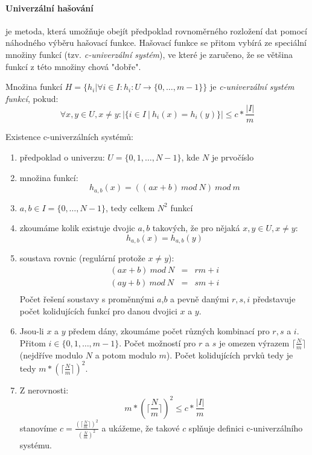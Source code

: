 \documentclass[a4paper]{article}      %
\newenvironment{definition}[1][Definice]{\begin{trivlist}
\item[\hskip \labelsep {\bfseries #1}]}{\end{trivlist}}
\begin{document}
\paragraph{Univerzální hašování} je metoda, která umožňuje obejít předpoklad rovnoměrného
rozložení dat pomocí náhodného výběru hašovací funkce. Hašovací funkce se přitom vybírá ze speciální množiny funkcí
(tzv. \emph{c-univerzální systém}), ve které je zaručeno, že se většina funkcí z této množiny chová "dobře".

\begin{definition}
Množina funkcí $H = \lbrace h_i | \forall i \in I: h_i: U \rightarrow \lbrace 0, \ldots, m-1 \rbrace \rbrace$ je \emph{c-univerzální systém funkcí}, pokud:
\[
\forall x,y \in U, x \neq y: |\lbrace i \in I\ |\ h_i(x) = h_i(y) \rbrace| \leq c*\frac{|I|}{m}
\]
\end{definition}

Existence c-univerzálních systémů:
\begin{enumerate}
\item předpoklad o univerzu: $U = \lbrace 0,1, \ldots, N-1\rbrace$, kde $N$ je prvočíslo
\item množina funkcí:
\[
h_{a,b}(x) = ((ax + b)\ mod\ N)\ mod\ m
\]
\item $a,b \in I = \lbrace 0, \ldots , N-1 \rbrace$, tedy celkem $N^{2}$ funkcí
\item zkoumáme kolik existuje dvojic $a,b$ takových, že pro nějaká $x,y \in U, x \neq y$:
\[
h_{a,b}(x) = h_{a,b}(y)
\]
\item soustava rovnic (regulární protože $x \neq y$):
\[
\begin{array}{lcl}
(ax+b)\ mod\ N & = & rm + i\\
(ay+b)\ mod\ N & = & sm + i\\
\end{array}
\]
Počet řešení soustavy s proměnnými $a$,$b$ a pevně danými $r,s,i$ představuje počet kolidujících funkcí pro danou dvojici $x$ a $y$.
\item Jsou-li $x$ a $y$ předem dány, zkoumáme počet různých kombinací pro $r,s$ a $i$.
Přitom $i \in \lbrace 0,1,\ldots,m-1 \rbrace$. Počet možností pro $r$ a $s$ je omezen výrazem $\lceil \frac{N}{m} \rceil$ (nejdříve modulo $N$ a potom modulo $m$). Počet kolidujících prvků tedy je tedy $m*\left( \lceil \frac{N}{m} \rceil \right)^{2}$.
\item Z nerovnosti:
\[
m*\left( \lceil \frac{N}{m} \rceil \right)^{2} \leq c*\frac{|I|}{m}
\]
stanovíme $c = \frac{\left( \lceil \frac{N}{m} \rceil \right)^{2}}{\left( \frac{N}{m} \right)^{2}}$
a ukážeme, že takové $c$ splňuje definici c-univerzálního systému.
\end{enumerate}
\end{document}
